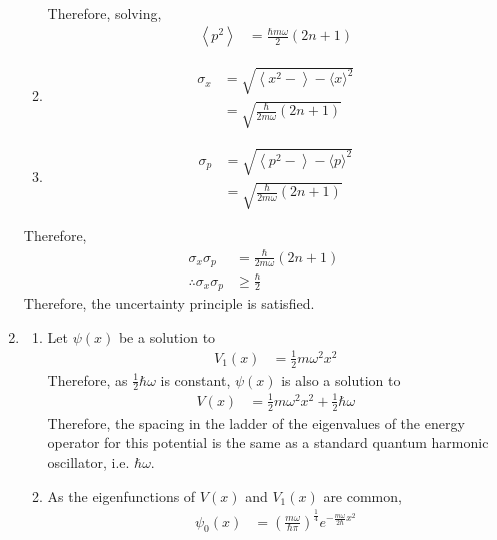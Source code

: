 \documentclass[fleqn, a4paper, 11pt, oneside]{amsart}
\theoremstyle{definition}
\theoremstyle{theorem}
\begin{document}
\begin{solution}
\begin{enumerate}[leftmargin=*]
\begin{enumerate}[leftmargin=*]
\begin{align*}
					\end{align*}
					Therefore, solving,
					\begin{align*}
						\left\langle p^2 \right\rangle & = \frac{\hbar m \omega}{2} (2 n + 1)
					\end{align*}
				\item
					\begin{align*}
						\sigma_x & = \sqrt{\left\langle x^2 - \right\rangle - \langle x \rangle^2} \\
                                                         & = \sqrt{\frac{\hbar}{2 m \omega} (2 n + 1)}
					\end{align*}
				\item
					\begin{align*}
						\sigma_p & = \sqrt{\left\langle p^2 - \right\rangle - \langle p \rangle^2} \\
                                                         & = \sqrt{\frac{\hbar}{2 m \omega} (2 n + 1)}
					\end{align*}
			\end{enumerate}
			Therefore,
			\begin{align*}
				\sigma_x \sigma_p            & = \frac{\hbar}{2 m \omega} (2 n + 1) \\
				\therefore \sigma_x \sigma_p & \ge \frac{\hbar}{2}
			\end{align*}
			Therefore, the uncertainty principle is satisfied.
		\item
			\begin{enumerate}[leftmargin=*]
				\item
					Let $\psi(x)$ be a solution to
					\begin{align*}
						V_1(x) & = \frac{1}{2} m \omega^2 x^2
					\end{align*}
					Therefore, as $\frac{1}{2} \hbar \omega$ is constant, $\psi(x)$ is also a solution to
					\begin{align*}
						V(x) & = \frac{1}{2} m \omega^2 x^2 + \frac{1}{2} \hbar \omega
					\end{align*}
					Therefore, the spacing in the ladder of the eigenvalues of the energy operator for this potential is the same as a standard quantum harmonic oscillator, i.e. $\hbar \omega$.
				\item
					As the eigenfunctions of $V(x)$ and $V_1(x)$ are common,
					\begin{align*}
						\psi_0(x) & = \left( \frac{m \omega}{\hbar \pi} \right)^{\frac{1}{4}} e^{-\frac{m \omega}{2 \hbar} x^2}
					\end{align*}

\end{enumerate}
\end{enumerate}
\end{solution}
\end{document}

